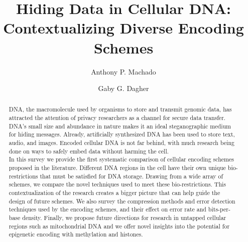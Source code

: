 \documentclass[USenglish,oneside,twocolumn]{article}
\begin{document}
  \author[1]{Anthony P. Machado}

  \author[2]{Gaby G. Dagher}



  \title{\huge Hiding Data in Cellular DNA: Contextualizing Diverse Encoding Schemes}



  \begin{abstract}
{DNA, the macromolecule used by organisms to store and transmit genomic data, has attracted the attention of privacy researchers as a channel for secure data transfer. DNA's small size and abundance in nature makes it an ideal steganographic medium for hiding messages. Already, artificially synthesized DNA has been used to store text, audio, and images. Encoded cellular DNA is not far behind, with much research being done on ways to safely embed data without harming the cell. \\
In this survey we provide the first systematic comparison of cellular encoding schemes proposed in the literature. Different DNA regions in the cell have their own unique bio-restrictions that must be satisfied for DNA storage. Drawing from a wide array of schemes, we compare the novel techniques used to meet these bio-restrictions. This contextualization of the research creates a bigger picture that can help guide the design of future schemes. We also survey the compression methods and error detection techniques used by the encoding schemes, and their effect on error rate and bits-per-base density. Finally, we propose future directions for research in untapped cellular regions such as mitochondrial DNA and we offer novel insights into the potential for epigenetic encoding with methylation and histones.}
\end{abstract}





\maketitle
\end{document}
